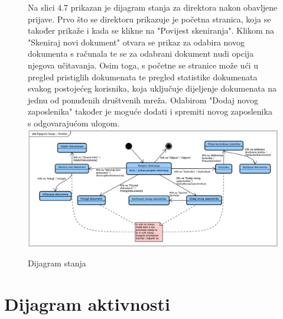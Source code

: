 			\begin{figure}[H]
				Na slici 4.7 prikazan je dijagram stanja za direktora nakon obavljene prijave. Prvo što se direktoru prikazuje je početna stranica, koja se također
				prikaže i kada se klikne na "Povijest skeniranja". Klikom na "Skeniraj novi dokument" otvara se prikaz za odabira novog dokumenta s računala te se
				za odabrani dokument nudi opcija njegova učitavanja. Osim toga, s početne se stranice može ući u pregled pristiglih dokumenata te pregled statistike
				dokumenata svakog postojećeg korisnika, koja uključuje dijeljenje dokumenata na jednu od ponuđenih društvenih mreža. Odabirom "Dodaj novog zaposlenika"
				također je moguće dodati i spremiti novog zaposlenika s odgovarajućom ulogom.
				\newline
				\includegraphics[width=\textwidth]{slike/StateMachine.png}
				\caption{Dijagram stanja}
				\label{fig:StateMachine}
			\end{figure}
			
			\eject 
		
		\section{Dijagram aktivnosti}
			
